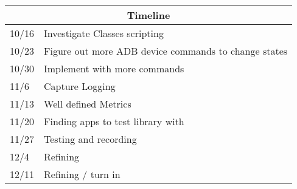 \begin{tabular}{ |p{3cm}||p{3cm}| }
	\hline
	\multicolumn{2}{|c|}{Timeline} \\
	\hline
		10/16 & Investigate Classes scripting \\
		\hline
	10/23&   Figure out more ADB device commands to change states  \\
	\hline
	10/30 &Implement with more commands \\
	\hline
	11/6    &Capture Logging	 \\
	\hline
	11/13& Well defined Metrics \\
	\hline
	11/20& Finding apps to test library with  \\
	\hline
	11/27& Testing and recording \\
	\hline
	12/4 & Refining \\
	\hline
	12/11 & Refining / turn in \\
	\hline
	
\end{tabular}
\\
